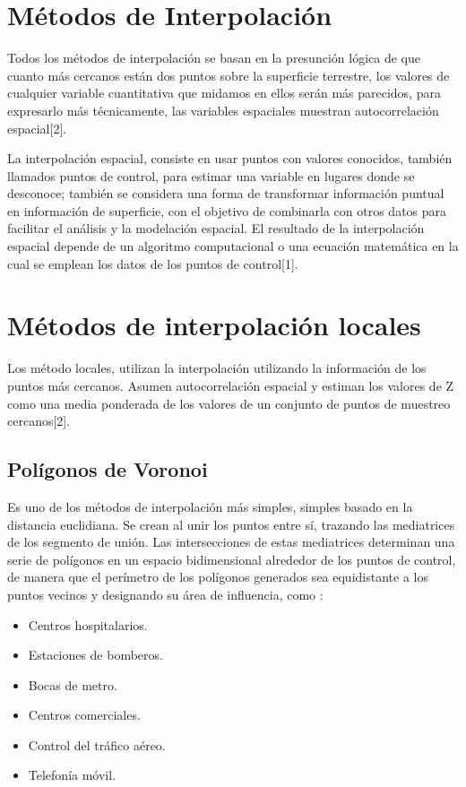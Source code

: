 \section{Métodos de Interpolación}
\label{sec:identificacion-focos-interpolacion}
Todos los métodos de interpolación se basan en la presunción lógica de que
cuanto más cercanos están dos puntos sobre la superficie terrestre, los
valores de cualquier variable cuantitativa que midamos en ellos serán más
parecidos, para expresarlo más técnicamente, las variables espaciales
muestran autocorrelación espacial[2].

La interpolación espacial, consiste en usar puntos con valores conocidos,
también llamados puntos de control, para estimar una variable en lugares
donde se desconoce; también se considera una forma de transformar información
puntual en información de superficie, con el objetivo de combinarla con
otros datos para facilitar el análisis y la modelación espacial.
El resultado de la interpolación espacial depende de un algoritmo
computacional o una ecuación matemática en la cual se emplean los datos
de los puntos de control[1].

\section{Métodos de interpolación locales}
Los método locales, utilizan la interpolación utilizando la información
de los puntos más cercanos. Asumen autocorrelación espacial y estiman los
valores de Z como una media ponderada de los valores de un conjunto de
puntos de muestreo cercanos[2].

\subsection{Polígonos de Voronoi}
Es uno de los métodos de interpolación más simples, simples basado en la
distancia euclidiana. Se crean al unir los puntos entre sí, trazando las
mediatrices de los segmento de unión. Las intersecciones de estas mediatrices
determinan una serie de polígonos en un espacio bidimensional alrededor de
los puntos de control, de manera que el perímetro de los polígonos generados
sea equidistante a los puntos vecinos y designando su área de influencia, como :
\begin{itemize}
    \item Centros hospitalarios.
    \item Estaciones de bomberos.
    \item Bocas de metro.
    \item Centros comerciales.
    \item Control del tráfico aéreo.
    \item Telefonía móvil.
\end{itemize}

